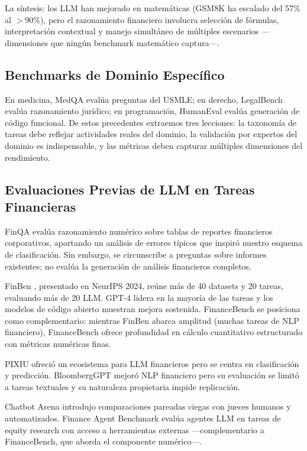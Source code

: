 \documentclass[12pt,a4paper]{article}
\begin{document}
La síntesis: los LLM han mejorado en matemáticas (GSM8K ha escalado del 57\% al $>$90\%), pero el razonamiento financiero involucra selección de fórmulas, interpretación contextual y manejo simultáneo de múltiples escenarios ---dimensiones que ningún benchmark matemático captura---.

\subsection{Benchmarks de Dominio Específico}

En medicina, MedQA evalúa preguntas del USMLE; en derecho, LegalBench evalúa razonamiento jurídico; en programación, HumanEval evalúa generación de código funcional. De estos precedentes extraemos tres lecciones: la taxonomía de tareas debe reflejar actividades reales del dominio, la validación por expertos del dominio es indispensable, y las métricas deben capturar múltiples dimensiones del rendimiento.

\subsection{Evaluaciones Previas de LLM en Tareas Financieras}

FinQA \citep{Chen2021} evalúa razonamiento numérico sobre tablas de reportes financieros corporativos, aportando un análisis de errores típicos que inspiró nuestro esquema de clasificación. Sin embargo, se circunscribe a preguntas sobre informes existentes; no evalúa la generación de análisis financieros completos.

FinBen \citep{Xie2024}, presentado en NeurIPS 2024, reúne más de 40 datasets y 20 tareas, evaluando más de 20 LLM. GPT-4 lidera en la mayoría de las tareas y los modelos de código abierto muestran mejora sostenida. FinanceBench se posiciona como complementario: mientras FinBen abarca amplitud (muchas tareas de NLP financiero), FinanceBench ofrece profundidad en cálculo cuantitativo estructurado con métricas numéricas finas.

PIXIU \citep{Xie2023} ofreció un ecosistema para LLM financieros pero se centra en clasificación y predicción. BloombergGPT \citep{Wu2023} mejoró NLP financiero pero su evaluación se limitó a tareas textuales y su naturaleza propietaria impide replicación.

Chatbot Arena \citep{Wang2024} introdujo comparaciones pareadas ciegas con jueces humanos y automatizados. Finance Agent Benchmark \citep{Bigeard2025} evalúa agentes LLM en tareas de equity research con acceso a herramientas externas ---complementario a FinanceBench, que aborda el componente numérico---.
\end{document}
